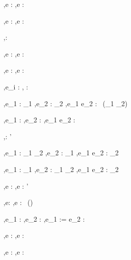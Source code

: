     {\Gamma,\Sigma \infers e : \List\tau}
    {\Gamma,\Sigma \infers \Tail e : \List\tau}


  {\Gamma,\Sigma \infers e : \tau}
  {\Gamma,\Sigma \infers \Done e : \Task \tau}

  {}
  {\Gamma,\Sigma \infers \Enter \beta : \Task \beta}

  {\Gamma,\Sigma \infers e : \beta}
  {\Gamma,\Sigma \infers \Update e : \Task \beta}

  {\Gamma,\Sigma \infers e : \beta}
  {\Gamma,\Sigma \infers \View e : \Task \beta}

  { \Quad
   \Gamma,\Sigma \infers e_i : \Task \tau}
  {\Gamma,\Sigma \infers \Pick {} : \Task \tau}


  {\Gamma,\Sigma \infers e_1 : \Task \tau_1 \Quad
   \Gamma,\Sigma \infers e_2 : \Task \tau_2}
  {\Gamma,\Sigma \infers e_1 \Pair e_2 : \Task\ (\tau_1 \times \tau_2)}

  {\Gamma,\Sigma \infers e_1 : \Task \tau \Quad
   \Gamma,\Sigma \infers e_2 : \Task \tau}
  {\Gamma,\Sigma \infers e_1 \Choose e_2 : \Task \tau}

  {}
  {\Gamma,\Sigma \infers \Fail : \Task \tau'}


  {\Gamma,\Sigma \infers e_1 : \tau_1 \to \tau_2 \Quad
   \Gamma,\Sigma \infers e_2 : \Task \tau_1}
  {\Gamma,\Sigma \infers e_1 \Trans e_2 : \Task \tau_2}

  {\Gamma,\Sigma \infers e_1 : \Task \tau_1 \Quad
   \Gamma,\Sigma \infers e_2 : \tau_1 \to \Task \tau_2}
  {\Gamma,\Sigma \infers e_1 \Step e_2 : \Task \tau_2}

  {\Gamma,\Sigma \infers e : \Task \tau}
  {\Gamma,\Sigma \infers \Forever e : \Task \tau'}


  {\Gamma,\Sigma \infers e: \beta}
  {\Gamma,\Sigma \infers \Share e : \Task\ (\Reference \beta)}

  {\Gamma,\Sigma \infers e_1 : \Reference \beta \Quad
   \Gamma,\Sigma \infers e_2 : \beta}
  {\Gamma,\Sigma \infers e_1 := e_2 : \Task \Unit}

  {\Gamma,\Sigma \infers e : \Reference \beta}
  {\Gamma,\Sigma \infers \Change e : \Task \beta}

  {\Gamma,\Sigma \infers e : \Reference \beta}
  {\Gamma,\Sigma \infers \Watch e : \Task \beta}



